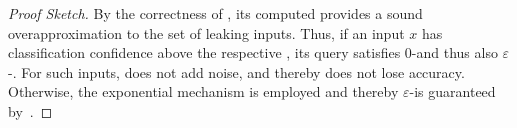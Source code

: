 \ftc*
\begin{proof}[Proof Sketch]
By the correctness of \boundtool, its computed \propa provides a sound overapproximation to the set of leaking inputs. Thus, if an input $x$ has classification confidence above the respective \propa, its query satisfies $0$-\propi and thus also $\varepsilon$-\propi. For such inputs, \tool does not add noise, and thereby does not lose accuracy.  
Otherwise, the exponential mechanism is employed and thereby $\varepsilon$-\propi is guaranteed by~. %
\end{proof}



